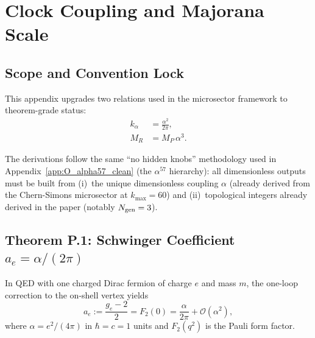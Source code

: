 
\section{Clock Coupling and Majorana Scale}\label{app:P_kalpha_MR}

\subsection{Scope and Convention Lock}

This appendix upgrades two relations used in the microsector framework to theorem-grade status:
\begin{align}
k_\alpha &= \frac{\alpha^2}{2\pi}, \label{eq:P_kalpha_target}\\
M_R &= M_P\,\alpha^3. \label{eq:P_MR_target}
\end{align}

The derivations follow the same ``no hidden knobs'' methodology used in Appendix~\ref{app:O_alpha57_clean} 
(the $\alpha^{57}$ hierarchy): all dimensionless outputs must be built from
(i)~the unique dimensionless coupling $\alpha$ (already derived from the Chern-Simons microsector at $k_{\max}=60$) and
(ii)~topological integers already derived in the paper (notably $N_{\rm gen}=3$).

\subsection{Theorem P.1: Schwinger Coefficient $a_e = \alpha/(2\pi)$}\label{sec:P_schwinger}

\begin{theorem}\label{thm:P_schwinger}
In QED with one charged Dirac fermion of charge $e$ and mass $m$, the one-loop correction to the on-shell vertex yields
\begin{equation}
a_e := \frac{g_e-2}{2} = F_2(0) = \frac{\alpha}{2\pi} + \mathcal{O}(\alpha^2),
\end{equation}
where $\alpha=e^2/(4\pi)$ in $\hbar=c=1$ units and $F_2(q^2)$ is the Pauli form factor.
\end{theorem}


